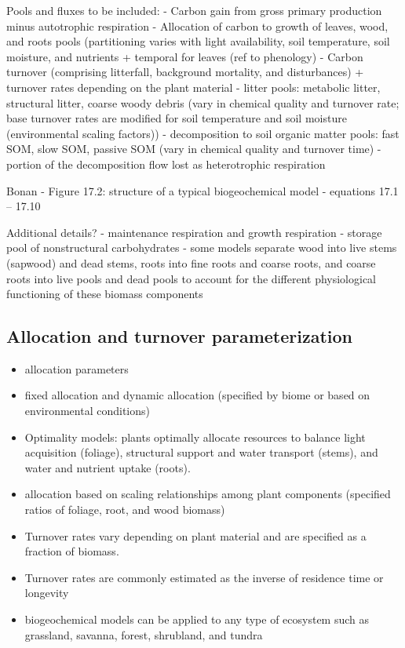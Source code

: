 \documentclass[
  oneside]{book}
\begin{document}
Pools and fluxes to be included:
- Carbon gain from gross primary production minus autotrophic respiration
- Allocation of carbon to growth of leaves, wood, and roots pools (partitioning varies with light availability, soil temperature, soil moisture, and nutrients + temporal for leaves (ref to phenology)
- Carbon turnover (comprising litterfall, background mortality, and disturbances) + turnover rates depending on the plant material
- litter pools: metabolic litter, structural litter, coarse woody debris (vary in chemical quality and turnover rate; base turnover rates are modified for soil temperature and soil moisture (environmental scaling factors))
- decomposition to soil organic matter pools: fast SOM, slow SOM, passive SOM (vary in chemical quality and turnover time)
- portion of the decomposition flow lost as heterotrophic respiration

Bonan
- Figure 17.2: structure of a typical biogeochemical model
- equations 17.1 -- 17.10

Additional details?
- maintenance respiration and growth respiration
- storage pool of nonstructural carbohydrates
- some models separate wood into live stems (sapwood) and dead stems, roots into fine roots and coarse roots, and coarse roots into live pools and dead pools to account for the different physiological functioning of these biomass components

\hypertarget{allocation-and-turnover-parameterization}{%
\subsection{Allocation and turnover parameterization}\label{allocation-and-turnover-parameterization}}

\begin{itemize}
\item
  allocation parameters
\item
  fixed allocation and dynamic allocation (specified by biome or based on environmental conditions)
\item
  Optimality models: plants optimally allocate resources to balance light acquisition (foliage), structural support and water transport (stems), and water and nutrient uptake (roots).
\item
  allocation based on scaling relationships among plant components (specified ratios of foliage, root, and wood biomass)
\item
  Turnover rates vary depending on plant material and are specified as a fraction of biomass.
\item
  Turnover rates are commonly estimated as the inverse of residence time or longevity
\item
  biogeochemical models can be applied to any type of ecosystem such as grassland, savanna, forest, shrubland, and tundra
\end{itemize}
\end{document}
